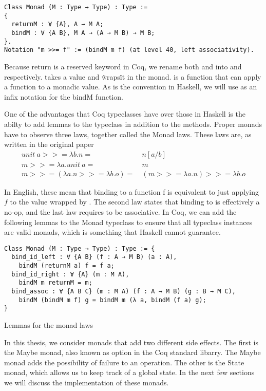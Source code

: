 \begin{verbatim}
Class Monad (M : Type → Type) : Type :=
{
  returnM : ∀ {A}, A → M A;
  bindM : ∀ {A B}, M A → (A → M B) → M B;
}.
Notation "m >>= f" := (bindM m f) (at level 40, left associativity).
\end{verbatim}

Because return is a reserved keyword in Coq, we rename both  and 
 into  and  respectively.
 takes a value and \"wraps\" it in the monad.  is
a function that can apply a function to a monadic value. As is the convention
in Haskell, we will use \coq{>>= } as an infix notation for the bindM
function.

One of the advantages that Coq typeclasses have over those in Haskell is the
abilty to add lemmas to the typeclass in addition to the methods. Proper monads
have to observe three laws, together called the Monad laws. These laws are, as
written in the original paper
\begin{align*}
    \textit{unit}\ a >>= \lambda b. n =&\ n[a/b] \\
    m >>= \lambda a . \textit{unit}\ a =&\ m \\
    m >>= (\lambda a.n >>= \lambda b.o) =&\ (m >>= \lambda a.n) >>= \lambda b.o
\end{align*}

In English, these mean that binding  to a function f is
equivalent to just applying $f$ to the value wrapped by . The
second law states that binding to  is effectively a no-op, and
the last law requires  to be associative. In Coq, we can add the
following lemmas to the Monad typeclass to ensure that all typeclass instances
are valid monads, which is something that Haskell cannot guarantee. 

\begin{listing}[H]
\begin{verbatim}
Class Monad (M : Type → Type) : Type := {
  bind_id_left : ∀ {A B} (f : A → M B) (a : A), 
    bindM (returnM a) f = f a;
  bind_id_right : ∀ {A} (m : M A),
    bindM m returnM = m;
  bind_assoc : ∀ {A B C} (m : M A) (f : A → M B) (g : B → M C),
    bindM (bindM m f) g = bindM m (λ a, bindM (f a) g);
}
\end{verbatim}
\caption{Lemmas for the monad laws}
\label{lst:monad_lemmas}
\end{listing}

In this thesis, we consider monads that add two different side effects. The
first is the Maybe monad, also known as option in the Coq standard libarry. 
The Maybe monad adds the
possibility of failure to an operation. The other is the State monad, which
allows us to keep track of a global state. In the next few sections we will
discuss the implementation of these monads.

